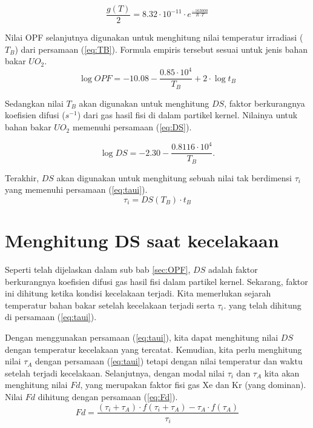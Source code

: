 \documentclass[a4paper,11pt]{report}
\begin{document}
\begin{equation}
  \frac{g(T)}{2}=8.32 \cdot 10^{-11} \cdot e^{\frac{-163000}{R \cdot T}}
  \label{eq:gt}
\end{equation} 
 
Nilai OPF selanjutnya digunakan untuk menghitung nilai temperatur irradiasi ($T_B$) dari persamaan (\ref{eq:TB}). Formula empiris tersebut sesuai untuk jenis bahan bakar $UO_2$.
\begin{equation}
  \log OPF=-10.08-\frac{0.85 \cdot 10^4}{T_B} + 2 \cdot \log t_B
  \label{eq:TB}
\end{equation} 

Sedangkan nilai $T_B$ akan digunakan untuk menghitung $DS$, faktor berkurangnya koefisien difusi ($s^{-1}$) dari gas hasil fisi di dalam partikel kernel. Nilainya untuk bahan bakar $UO_2$ memenuhi persamaan (\ref{eq:DS}).

\begin{equation}
  \log DS=-2.30-\frac{0.8116 \cdot 10^4}{T_B}
  \label{eq:DS}.
\end{equation}

Terakhir, $DS$ akan digunakan untuk menghitung sebuah nilai tak berdimensi $\tau_i$ yang memenuhi persamaan (\ref{eq:taui}).
\begin{equation}
  \tau_i=DS(T_B) \cdot t_B
  \label{eq:taui}
\end{equation}

\section{Menghitung DS saat kecelakaan}
Seperti telah dijelaskan dalam sub bab \ref{sec:OPF}, $DS$ adalah faktor berkurangnya koefisien difusi gas hasil fisi dalam partikel kernel. Sekarang, faktor ini dihitung ketika kondisi kecelakaan terjadi. Kita memerlukan sejarah temperatur bahan bakar setelah kecelakaan terjadi serta $\tau_i$. yang telah dihitung di persamaan (\ref{eq:taui}).

Dengan menggunakan persamaan (\ref{eq:taui}), kita dapat menghitung nilai $DS$ dengan temperatur kecelakaan yang tercatat.  Kemudian, kita perlu menghitung nilai $\tau_A$ dengan persamaan (\ref{eq:taui}) tetapi dengan nilai temperatur dan waktu setelah terjadi kecelakaan. Selanjutnya, dengan modal nilai $\tau_i$ dan $\tau_A$ kita akan menghitung nilai $Fd$, yang merupakan faktor fisi gas Xe dan Kr (yang dominan). Nilai $Fd$ dihitung dengan persamaan (\ref{eq:Fd}).
\begin{equation}
  Fd=\frac{(\tau_i + \tau_A) \cdot f(\tau_i + \tau_A) - \tau_A \cdot f(\tau_A)}{\tau_i}
  \label{eq:Fd}
\end{equation}
\end{document}
